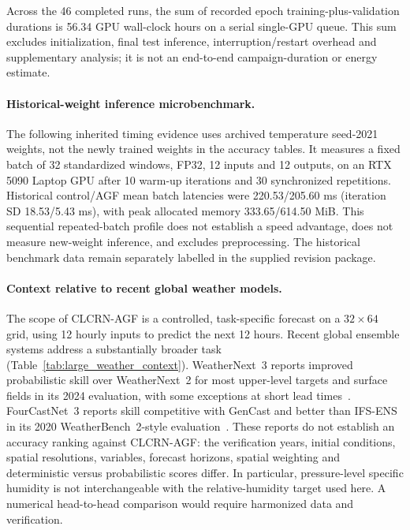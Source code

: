 \documentclass[fleqn,10pt]{wlscirep}
\begin{document}
Across the 46 completed runs, the sum of recorded epoch training-plus-validation durations is 56.34 GPU wall-clock hours on a serial single-GPU queue. This sum excludes initialization, final test inference, interruption/restart overhead and supplementary analysis; it is not an end-to-end campaign-duration or energy estimate.

\paragraph{Historical-weight inference microbenchmark.}

The following inherited timing evidence uses archived temperature seed-2021 weights, not the newly trained weights in the accuracy tables. It measures a fixed batch of 32 standardized windows, FP32, 12 inputs and 12 outputs, on an RTX 5090 Laptop GPU after 10 warm-up iterations and 30 synchronized repetitions. Historical control/AGF mean batch latencies were 220.53/205.60 ms (iteration SD 18.53/5.43 ms), with peak allocated memory 333.65/614.50 MiB. This sequential repeated-batch profile does not establish a speed advantage, does not measure new-weight inference, and excludes preprocessing. The historical benchmark data remain separately labelled in the supplied revision package.

\paragraph{Context relative to recent global weather models.}
The scope of CLCRN-AGF is a controlled, task-specific forecast on a
$32\times64$ grid, using 12 hourly inputs to predict the next 12 hours.
Recent global ensemble systems address a substantially broader task
(Table~\ref{tab:large_weather_context}). WeatherNext~3 reports improved
probabilistic skill over WeatherNext~2 for most upper-level targets and
surface fields in its 2024 evaluation, with some exceptions at short lead
times~\cite{rasp2026weathernext3}. FourCastNet~3 reports skill competitive
with GenCast and better than IFS-ENS in its 2020 WeatherBench~2-style
evaluation~\cite{bonev2025fourcastnet3}. These reports do not establish an
accuracy ranking against CLCRN-AGF: the verification years, initial
conditions, spatial resolutions, variables, forecast horizons, spatial
weighting and deterministic versus probabilistic scores differ. In
particular, pressure-level specific humidity is not interchangeable with
the relative-humidity target used here. A numerical head-to-head comparison would
require harmonized data and verification.
\end{document}
